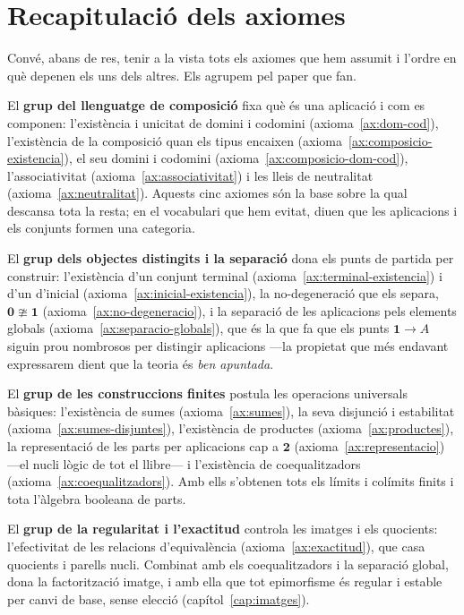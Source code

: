 \section{Recapitulació dels axiomes}\label{sec:recapitulacio-axiomes}

Convé, abans de res, tenir a la vista tots els axiomes que hem assumit i
l'ordre en què depenen els uns dels altres. Els agrupem pel paper que fan.

El \textbf{grup del llenguatge de composició} fixa què és una aplicació i
com es componen: l'existència i unicitat de domini i codomini
(axioma~\ref{ax:dom-cod}), l'existència de la composició quan els tipus
encaixen (axioma~\ref{ax:composicio-existencia}), el seu domini i codomini
(axioma~\ref{ax:composicio-dom-cod}), l'associativitat
(axioma~\ref{ax:associativitat}) i les lleis de neutralitat
(axioma~\ref{ax:neutralitat}). Aquests cinc axiomes són la base sobre la
qual descansa tota la resta; en el vocabulari que hem evitat, diuen que les
aplicacions i els conjunts formen una categoria.

El \textbf{grup dels objectes distingits i la separació} dona els punts de
partida per construir: l'existència d'un conjunt terminal
(axioma~\ref{ax:terminal-existencia}) i d'un d'inicial
(axioma~\ref{ax:inicial-existencia}), la no-degeneració que els separa,
\(\mathbf0\ncong\mathbf1\) (axioma~\ref{ax:no-degeneracio}), i la separació
de les aplicacions pels elements globals
(axioma~\ref{ax:separacio-globals}), que és la que fa que els punts
\(\mathbf1\to A\) siguin prou nombrosos per distingir aplicacions ---la
propietat que més endavant expressarem dient que la teoria és \emph{ben
apuntada}.

El \textbf{grup de les construccions finites} postula les operacions
universals bàsiques: l'existència de sumes (axioma~\ref{ax:sumes}), la seva
disjunció i estabilitat (axioma~\ref{ax:sumes-disjuntes}), l'existència de
productes (axioma~\ref{ax:productes}), la representació de les parts per
aplicacions cap a \(\mathbf2\) (axioma~\ref{ax:representacio}) ---el nucli
lògic de tot el llibre--- i l'existència de coequalitzadors
(axioma~\ref{ax:coequalitzadors}). Amb ells s'obtenen tots els límits i
colímits finits i tota l'àlgebra booleana de parts.

El \textbf{grup de la regularitat i l'exactitud} controla les imatges i
els quocients: l'efectivitat de les relacions d'equivalència
(axioma~\ref{ax:exactitud}), que casa quocients i parells nucli. Combinat
amb els coequalitzadors i la separació global, dona la factorització
imatge, i amb ella que tot epimorfisme és regular i estable per canvi de
base, sense elecció (capítol~\ref{cap:imatges}).

